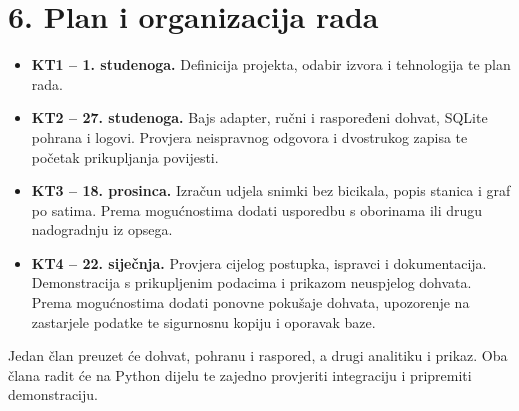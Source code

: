 \documentclass[a4paper,11pt]{article}
\begin{document}
\section*{6. Plan i organizacija rada}
\begin{itemize}
\item \textbf{KT1 -- 1. studenoga.} Definicija projekta, odabir izvora
i tehnologija te plan rada.
\item \textbf{KT2 -- 27. studenoga.} Bajs adapter, ručni i raspoređeni
dohvat, SQLite pohrana i logovi. Provjera neispravnog odgovora i
dvostrukog zapisa te početak prikupljanja povijesti.
\item \textbf{KT3 -- 18. prosinca.} Izračun udjela snimki bez bicikala,
popis stanica i graf po satima. Prema mogućnostima dodati usporedbu
s oborinama ili drugu nadogradnju iz opsega.
\item \textbf{KT4 -- 22. siječnja.} Provjera cijelog postupka, ispravci
i dokumentacija. Demonstracija s prikupljenim podacima i prikazom
neuspjelog dohvata. Prema mogućnostima dodati ponovne pokušaje dohvata,
upozorenje na zastarjele podatke te sigurnosnu kopiju i oporavak baze.
\end{itemize}

Jedan član preuzet će dohvat, pohranu i raspored, a drugi analitiku
i prikaz. Oba člana radit će na Python dijelu te zajedno provjeriti
integraciju i pripremiti demonstraciju.
\end{document}
